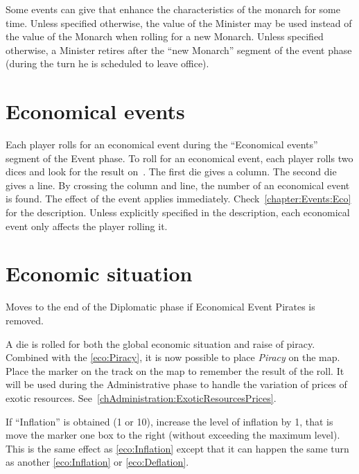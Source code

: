 
\label{chEvents:Excellent Ministers} Some
events can give  that enhance the
characteristics of the monarch for some time.
\bparag Unless specified otherwise, the value of the Minister may be
used instead of the value of the Monarch when rolling for a new Monarch.
\bparag Unless specified otherwise, a Minister retires after the ``new
Monarch'' segment of the event phase (during the turn he is scheduled to
leave office).




\section{Economical events}\label{chEvents:eco-events}

\aparag Each player rolls for an economical event during the
``Economical events'' segment of the Event phase.
\aparag To roll for an economical event, each player rolls two dices and
look for the result on~.
\bparag The first die gives a column. The second die gives a line. By
crossing the column and line, the number of an economical event is
found.
\bparag The effect of the event applies
immediately. Check~\ref{chapter:Events:Eco} for the description.
\aparag Unless explicitly specified in the description, each economical
event only affects the player rolling it.




\section{Economic situation}
\label{chEvents:Economic situation}

\begin{todo}
  [TBD] Moves to the end of the Diplomatic phase if Economical Event
  Pirates is removed.
\end{todo}

 A die is rolled for both the global economic
situation and raise of piracy.
\bparag Combined with the \ref{eco:Piracy}, it is now possible to place
\emph{Piracy} on the map.
\bparag Place the  marker on the track on the
\ROTW map to remember the result of the roll. It will be used during the
Administrative phase to handle the variation of prices of exotic
resources. See~\ref{chAdministration:ExoticResourcesPrices}.

\aparag[Inflation] \label{chEvents:Inflation}
\bparag If ``Inflation'' is obtained (1 or 10), increase the level of
inflation by 1, that is move the marker one box to the right (without
exceeding the maximum level). This is the same effect as
\ref{eco:Inflation} except that it can happen the same turn as another
\ref{eco:Inflation} or \ref{eco:Deflation}.


